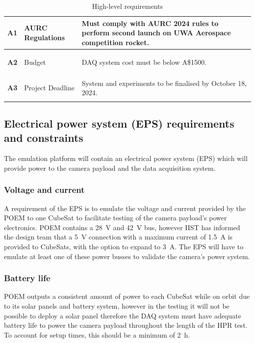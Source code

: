 \documentclass[]{report}
\newcommand{\aud}{A\$}
\begin{document}
\begin{table}[h!]
\begin{tabular}{|l|L{0.25\textwidth}|L{0.6\textwidth}|}
    \hypertarget{req-A1}{\textbf{A1}} & AURC Regulations               & Must comply with AURC 2024 rules to perform second launch on UWA Aerospace competition rocket.              \\ \hline
    \hypertarget{req-A2}{\textbf{A2}} & Budget                         & DAQ system cost must be below \aud 1500.                                                                    \\ \hline
    \hypertarget{req-A3}{\textbf{A3}} & Project Deadline               & System and experiments to be finalised by October 18, 2024.                                                 \\ \hline
  \end{tabular}
  \caption{High-level requirements}
  \label{tabl:high-level-requirements}
\end{table}


\subsection{Electrical power system (EPS) requirements and constraints}
The emulation platform will contain an electrical power system (EPS) which will provide power to the camera payload and the data acquisition system.

\subsubsection{Voltage and current}
A requirement of the EPS is to emulate the voltage and current provided by the POEM to one CubeSat to facilitate testing of the camera payload's power electronics. POEM contains a \SI{28}{\volt} and \SI{42}{\volt} bus, however IIST has informed the design team that a \SI{5}{\volt} connection with a maximum current of \SI{1.5}{\ampere} is provided to CubeSats, with the option to expand to \SI{3}{\ampere}. The EPS will have to emulate at least one of these power busses to validate the camera's power system.

\subsubsection{Battery life}
POEM outputs a consistent amount of power to each CubeSat while on orbit due to its solar panels and battery system, however in the testing it will not be possible to deploy a solar panel therefore the DAQ system must have adequate battery life to power the camera payload throughout the length of the HPR test. To account for setup times, this should be a minimum of \SI{2}{\hour}.
\end{document}
